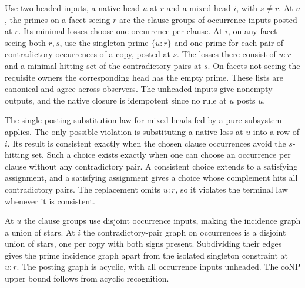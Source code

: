Use two headed inputs, a native head $u$ at $r$ and
a mixed head $i$, with $s\ne r$. At $u$, the primes
on a facet seeing $r$ are the clause groups of
occurrence inputs posted at $r$. Its minimal losses
choose one occurrence per clause. At $i$, on any
facet seeing both $r,s$, use the singleton prime
$\{u:r\}$ and one prime for each pair of contradictory
occurrences of a copy, posted at $s$. The losses
there consist of $u:r$ and a minimal hitting set
of the contradictory pairs at $s$. On facets not
seeing the requisite owners the corresponding
head has the empty prime. These lists are canonical
and agree across observers. The unheaded inputs
give nonempty outputs, and the native closure is
idempotent since no rule at $u$ posts $u$.

The single-posting substitution law for mixed
heads fed by a pure subsystem applies. The only
possible violation is substituting a native loss
at $u$ into a row of $i$. Its result is consistent
exactly when the chosen clause occurrences avoid
the $s$-hitting set. Such a choice exists exactly
when one can choose an occurrence per clause
without any contradictory pair. A consistent
choice extends to a satisfying assignment, and
a satisfying assignment gives a choice whose
complement hits all contradictory pairs.
The replacement omits $u:r$, so it violates the
terminal law whenever it is consistent.

At $u$ the clause groups use disjoint occurrence
inputs, making the incidence graph a union of
stars. At $i$ the contradictory-pair graph on
occurrences is a disjoint union of stars, one
per copy with both signs present. Subdividing
their edges gives the prime incidence graph
apart from the isolated singleton constraint
at $u:r$. The posting graph is acyclic, with
all occurrence inputs unheaded. The coNP
upper bound follows from acyclic recognition.

